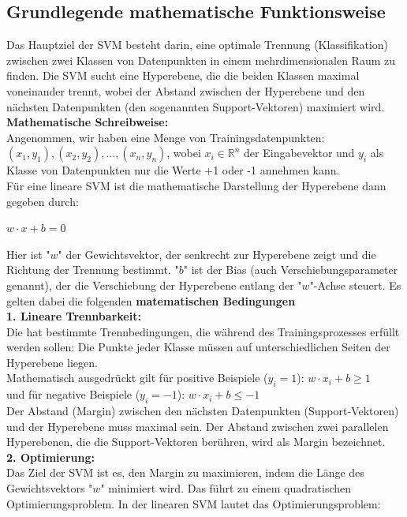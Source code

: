 \documentclass[12pt]{article}
\begin{document}
\subsection{Grundlegende mathematische Funktionsweise}
Das Hauptziel der SVM besteht darin, eine optimale Trennung (Klassifikation) zwischen zwei Klassen von Datenpunkten in einem mehrdimensionalen Raum zu finden. Die SVM sucht eine Hyperebene, die die beiden Klassen maximal voneinander trennt, wobei der Abstand zwischen der Hyperebene und den nächsten Datenpunkten (den sogenannten Support-Vektoren) maximiert wird.
\\
\textbf{Mathematische Schreibweise:}
\\Angenommen, wir haben eine Menge von Trainingsdatenpunkten: ${(x_1, y_1), (x_2, y_2),... , (x_n, y_n)}$, wobei $x_i \in \mathbb{R}^n$ der Eingabevektor und $y_i$ als Klasse von Datenpunkten nur die Werte +1 oder -1 annehmen kann.\\
Für eine lineare SVM ist die mathematische Darstellung der Hyperebene dann gegeben durch:
\begin{center}
\begin{large} \textbf{$w \cdot x + b = 0$} \end{large} 
\end{center}
Hier ist "$w$" der Gewichtsvektor, der senkrecht zur Hyperebene zeigt und die Richtung der Trennung bestimmt. "$b$" ist der Bias (auch Verschiebungsparameter genannt), der die Verschiebung der Hyperebene entlang der "$w$"-Achse steuert. Es gelten dabei die folgenden \textbf{matematischen Bedingungen}\\
\textbf{1. Lineare Trennbarkeit:}\\
Die {\color{blue}{SVM}}  hat bestimmte Trennbedingungen, die während des Trainingsprozesses erfüllt werden sollen:
Die Punkte jeder Klasse müssen auf unterschiedlichen Seiten der Hyperebene liegen.\\
Mathematisch ausgedrückt gilt für positive Beispiele ($y_i = 1$): $w \cdot x_i + b \geq 1$\\
und für negative Beispiele ($y_i = -1$): $w \cdot x_i + b \leq -1$\\
Der Abstand (Margin) zwischen den nächsten Datenpunkten (Support-Vektoren) und der Hyperebene muss maximal sein. Der Abstand zwischen zwei parallelen Hyperebenen, die die Support-Vektoren berühren, wird als Margin bezeichnet.\\
\textbf{2. Optimierung:}\\Das Ziel der SVM ist es, den Margin zu maximieren, indem die Länge des Gewichtsvektors "$w$" minimiert wird. Das führt zu einem quadratischen Optimierungsproblem. In der linearen SVM lautet das Optimierungsproblem:
\end{document}
